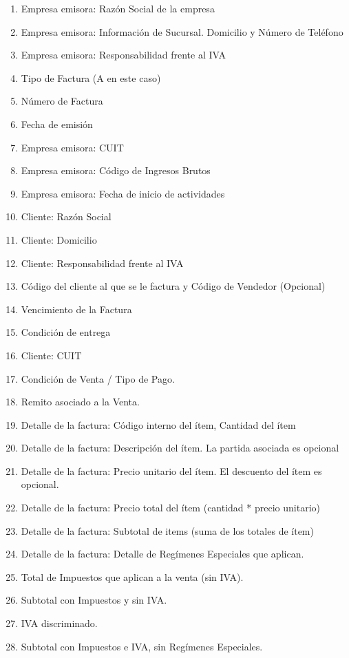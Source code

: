   \begin{enumerate}
   \item Empresa emisora: Raz\'on Social de la empresa
   \item Empresa emisora: Información de Sucursal. Domicilio y N\'umero de Tel\'efono
   \item Empresa emisora: Responsabilidad frente al IVA
   \item Tipo de Factura (A en este caso)
   \item N\'umero de Factura
   \item Fecha de emisi\'on
   \item Empresa emisora: CUIT
   \item Empresa emisora: C\'odigo de Ingresos Brutos
   \item Empresa emisora: Fecha de inicio de actividades
   \item Cliente: Raz\'on Social 
   \item Cliente: Domicilio
   \item Cliente: Responsabilidad frente al IVA
   \item C\'odigo del cliente al que se le factura y C\'odigo de Vendedor (Opcional)
   \item Vencimiento de la Factura
   \item Condici\'on de entrega
   \item Cliente: CUIT
   \item Condici\'on de Venta / Tipo de Pago.
   \item Remito asociado a la Venta.
   \item Detalle de la factura: C\'odigo interno del \'item, Cantidad del \'item
   \item Detalle de la factura: Descripci\'on del \'item. La partida asociada es opcional
   \item Detalle de la factura: Precio unitario del \'item. El descuento del \'item es opcional.
   \item Detalle de la factura: Precio total del \'item (cantidad * precio unitario)
   \item Detalle de la factura: Subtotal de items (suma de los totales de \'item)
   \item Detalle de la factura: Detalle de Regímenes Especiales que aplican.
   \item Total de Impuestos que aplican a la venta (sin IVA).
   \item Subtotal con Impuestos y sin IVA.
   \item IVA discriminado.
   \item Subtotal con Impuestos e IVA, sin Reg\'imenes Especiales.

\end{enumerate}
